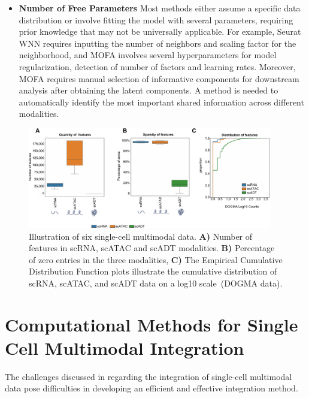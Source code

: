 \begin{itemize}
    \item \textbf{Number of Free Parameters}
    Most methods either assume a specific data distribution or involve fitting the model with several parameters, requiring prior knowledge that may not be universally applicable. For example, Seurat WNN requires inputting the number of neighbors and scaling factor for the neighborhood, and MOFA involves several hyperparameters for model regularization, detection of number of factors and learning rates. Moreover, MOFA requires manual selection of informative components for downstream analysis after obtaining the latent components. A method is needed to automatically identify the most important shared information across different modalities.

\end{itemize}

\begin{figure}[!ht]
	\centering
	\includegraphics[width=0.95\textwidth]{feature_statistic/fig}
	\vspace{0.1cm}
	\caption[features characteristics comparison showing the challenge of multimodal integration.]{Illustration of six single-cell multimodal data. \textbf{A)} Number of features in scRNA, scATAC and scADT modalities. \textbf{B)} Percentage of zero entries in the three modalities, \textbf{C)} The Empirical Cumulative Distribution Function plots illustrate the cumulative distribution of scRNA, scATAC, and scADT data on a log10 scale~(DOGMA data).}
	\label{fig:modalities_differences}
\end{figure}



\section{Computational Methods for Single Cell Multimodal Integration}
\label{bgInte:integration}
The challenges discussed in  regarding the integration of single-cell multimodal data pose difficulties in developing an efficient and effective integration method.

